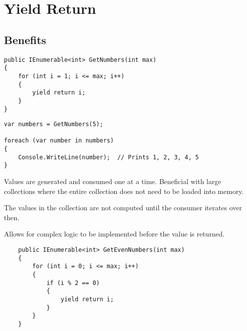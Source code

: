 \chapter{Yield Return}

\section{Benefits}

\begin{lstlisting}
public IEnumerable<int> GetNumbers(int max)
{
    for (int i = 1; i <= max; i++)
    {
        yield return i;
    }
}
\end{lstlisting}

\begin{lstlisting}
var numbers = GetNumbers(5);

foreach (var number in numbers)
{
    Console.WriteLine(number);  // Prints 1, 2, 3, 4, 5
}
\end{lstlisting}

\begin{items}
    \item Values are generated and consumed one at a time. Beneficial with large collections where the entire collection does not need to be loaded into memory.
    \item The values in the collection are not computed until the consumer iterates over then.
    \item Allows for complex logic to be implemented before the value is returned.

    \begin{lstlisting}
    public IEnumerable<int> GetEvenNumbers(int max)
    {
        for (int i = 0; i <= max; i++)
        {
            if (i % 2 == 0)
            {
                yield return i;
            }
        }
    }
    \end{lstlisting}
\end{items}
